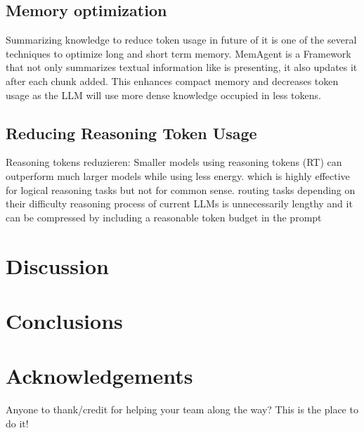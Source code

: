 \documentclass[10pt,twocolumn,letterpaper]{article}
\begin{document}
\subsection{Memory optimization}
Summarizing knowledge to reduce token usage in future of it is one of the several techniques to optimize long and short term memory. MemAgent \citep{Chaudhry_Choukse_Qiu_Goiri_Fonseca_Belay_Bianchini_2025} is a Framework that not only summarizes textual information like \cite{Yang_Li_Zhou_Zhu_Qu_Fan_Wei_Ye_Kang_Qin_et_al._2026} is presenting, it also updates it after each chunk added. This enhances compact memory and decreases token usage as the LLM will use more dense knowledge occupied in less tokens.

\subsection{Reducing Reasoning Token Usage}
Reasoning tokens reduzieren:
\citep{Jin_Wei_Brooks_2025} Smaller models using reasoning tokens (RT) can outperform much larger models while using less energy. which is highly effective for logical reasoning tasks but not for common sense. routing tasks depending on their difficulty
\citep{Han_Wang_Fang_Zhao_Ma_Chen_2025}
reasoning process of current LLMs is unnecessarily lengthy and it can be compressed by including a reasonable token budget in the prompt



\section{Discussion}

\section*{Conclusions}

\section*{Acknowledgements}
Anyone to thank/credit for helping your team along the way? This is the place to do it!


\end{document}
